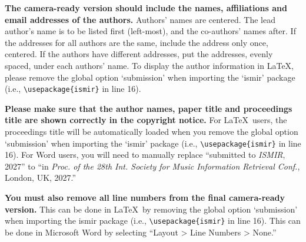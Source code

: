 \documentclass{article}
\begin{document}
\textbf{The camera-ready version should include the names, affiliations and email addresses of the authors.} Authors' names are centered. The lead author's name is to be listed first (left-most), and the co-authors' names after. If the addresses for all authors are the same, include the address only once, centered. If the authors have different addresses, put the addresses, evenly spaced, under each authors' name. To display the author information in \LaTeX, please remove the global option `submission' when importing the `ismir' package (i.e., \texttt{\textbackslash usepackage\{ismir\}} in line 16).

\textbf{Please make sure that the author names, paper title and proceedings title are shown correctly in the copyright notice.} For \LaTeX\ users, the proceedings title will be automatically loaded when you remove the global option `submission' when importing the `ismir' package (i.e., \texttt{\textbackslash usepackage\{ismir\}} in line 16). For Word users, you will need to manually replace ``submitted to \textit{ISMIR}, 2027'' to ``in \textit{Proc. of the 28th Int. Society for Music Information Retrieval Conf.}, London, UK, 2027.''

\textbf{You must also remove all line numbers from the final camera-ready version.} This can be done in \LaTeX\ by removing the global option `submission' when importing the ismir package (i.e., \texttt{\textbackslash usepackage\{ismir\}} in line 16). This can be done in Microsoft Word by selecting ``Layout > Line Numbers > None.''



%
%
%
%
\end{document}
